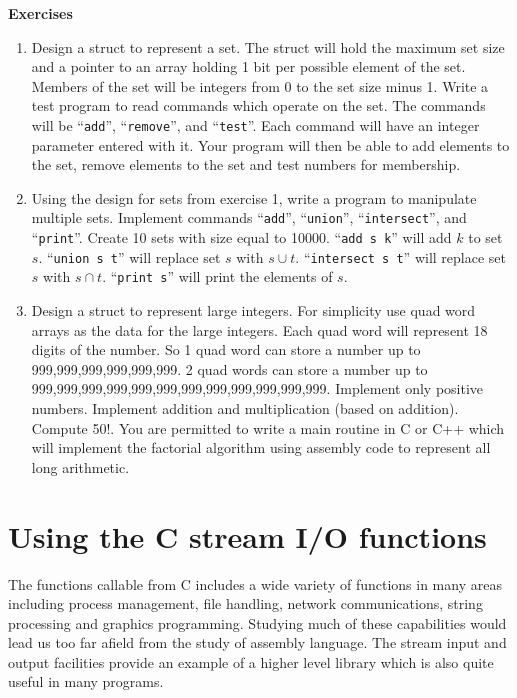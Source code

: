 \documentclass[11pt,b5paper]{book}
\begin{document}
\vfill
\break
{\bf\large Exercises}

\begin{enumerate}
    \item Design a struct to represent a set.
    The struct will hold the maximum set size and a pointer to an array holding 1 bit per possible
    element of the set.
    Members of the set will be integers from 0 to the set size minus 1.
    Write a test program to read commands which operate on the set.
    The commands will be ``{\tt add}'', ``{\tt remove}'', and ``{\tt test}''.
    Each command will have an integer parameter entered with it.
    Your program will then be able to add elements to the set, remove elements to the set
    and test numbers for membership.
    
    \item Using the design for sets from exercise 1, write a program to manipulate multiple sets.
    Implement commands ``{\tt add}'', ``{\tt union}'', ``{\tt intersect}'', and ``{\tt print}''.
    Create 10 sets with size equal to 10000.
    ``{\tt add s k}'' will add $k$ to set $s$.
    ``{\tt union s t}'' will replace set $s$ with $s \cup t$.
    ``{\tt intersect s t}'' will replace set $s$ with $s \cap t$.
    ``{\tt print s}'' will print the elements of $s$.
    
    \item Design a struct to represent large integers.
    For simplicity use quad word arrays as the data for the large integers.
    Each quad word will represent 18 digits of the number.
    So 1 quad word can store a number up to 999,999,999,999,999,999.
    2 quad words can store a number up to 999,999,999,999,999,999,999,999,999,999,999,999.
    Implement only positive numbers. Implement addition and multiplication (based on addition).
    Compute 50!.
    You are permitted to write a main routine in C or C++ which will implement the factorial
    algorithm using assembly code to represent all long arithmetic.
    
\end{enumerate}

\chapter{Using the C stream I/O functions}

The functions callable from C includes a wide variety of functions in many areas including process management, file handling,
network communications, string processing and graphics programming.
Studying much of these capabilities would lead us too far afield from the study of assembly language.
The stream input and output facilities provide an example of a higher level library which is also
quite useful in many programs.
\end{document}
